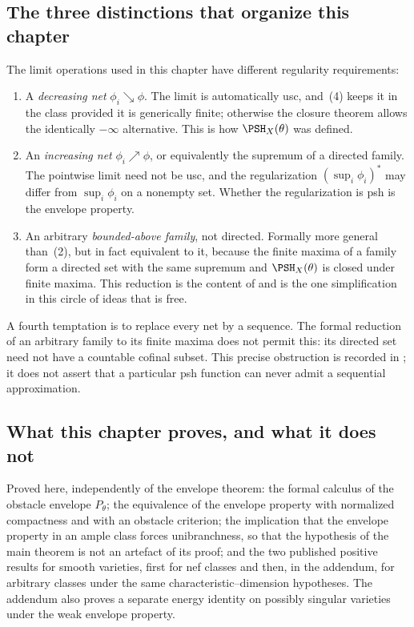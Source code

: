 \subsection{The three distinctions that organize this chapter}

The limit operations used in this chapter have different regularity
requirements:

\begin{enumerate}
\item A \emph{decreasing net} $\phi_i\searrow\phi$.  The limit is
      automatically usc, and \,(4) keeps it in the
      class provided it is generically finite; otherwise the closure theorem
      allows the identically $-\infty$ alternative.  This is how
      $\PSH_X(\theta)$ was defined.
\item An \emph{increasing net} $\phi_i\nearrow\phi$, or equivalently the
      supremum of a directed family.  The pointwise limit need not be usc,
      and the regularization $(\sup_i\phi_i)^*$ may differ from
      $\sup_i\phi_i$ on a nonempty set.  Whether the regularization is psh
      is the envelope property.
\item An arbitrary \emph{bounded-above family}, not directed.  Formally more
      general than~(2), but in fact equivalent to it, because the finite
      maxima of a family form a directed set with the same supremum and
      $\PSH_X(\theta)$ is closed under finite maxima.  This reduction is
      the content of  and is the one
      simplification in this circle of ideas that is free.
\end{enumerate}

A fourth temptation is to replace every net by a sequence.  The formal
reduction of an arbitrary family to its finite maxima does not permit this:
its directed set need not have a countable cofinal subset.  This precise
obstruction is recorded in ; it does not assert that a
particular psh function can never admit a sequential approximation.

\subsection{What this chapter proves, and what it does not}

Proved here, independently of the envelope theorem: the formal calculus of
the obstacle envelope $P_\theta$; the equivalence of the envelope
property with normalized compactness and with an obstacle criterion; the
implication that the envelope property in an ample class forces
unibranchness, so that the hypothesis of the main theorem is not an artefact
of its proof; and the two published positive results for smooth varieties,
first for nef classes and then, in the addendum, for arbitrary classes under
the same characteristic--dimension hypotheses.  The
addendum also proves a separate energy identity on possibly singular
varieties under the weak envelope property.

